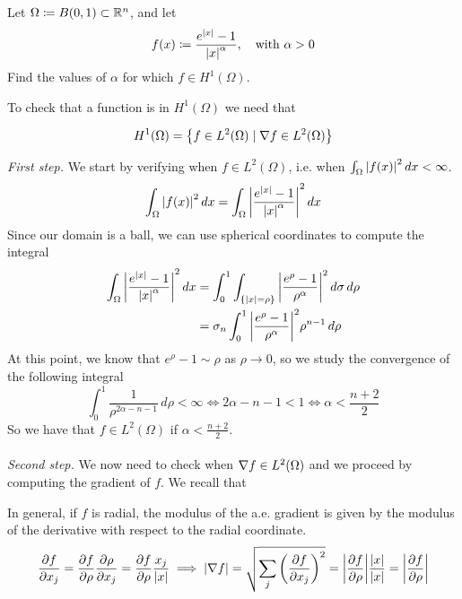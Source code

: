 \newpage
\begin{exercise}
    Let \(\Omega \coloneqq B(0, 1) \subset \mathbb{R}^n\), and let 
    \[
        f(x) \coloneqq \frac{e^{\abs{x}}-1}{\abs{x}^\alpha}, \quad \text{with } \alpha > 0
    \]
    Find the values of \(\alpha\) for which \(f \in H^1(\Omega)\).
\end{exercise}
To check that a function is in \(H^1(\Omega)\) we need that
\begin{remark}
    \[
        H^1(\Omega) = \left\{ f \in L^2(\Omega) \mid \nabla f \in L^2(\Omega) \right\}
    \]  
\end{remark}
\textit{First step.} We start by verifying when \(f \in L^2(\Omega)\), i.e. when \(\int_\Omega \abs{f(x)}^2 \, dx < \infty\).
\[
    \begin{split}
        \int_\Omega \abs{f(x)}^2 \, dx = \int_\Omega \abs{\frac{e^{\abs{x}}-1}{\abs{x}^\alpha}}^2 \, dx
    \end{split}
\]
Since our domain is a ball, we can use spherical coordinates to compute the integral
\begin{align*}
\int_\Omega \abs{\frac{e^{\abs{x}}-1}{\abs{x}^\alpha}}^2 \, dx &= \int_0^1 \int_{\left\{\abs{x} = \rho\right\}} \abs{\frac{e^\rho-1}{\rho^\alpha}}^2 \, d\sigma \, d\rho \\
&= \sigma_n \int_0^1 \abs{\frac{e^\rho-1}{\rho^\alpha}}^2 \rho^{n-1} \, d\rho
\end{align*}
At this point, we know that $e^\rho - 1 \sim \rho$ as $\rho \to 0$, so we study the convergence of the following integral
\begin{equation*}
\int_0^1 \frac{1}{\rho^{2\alpha - n - 1}} \, d\rho < \infty \iff 2 \alpha - n - 1 < 1 \iff \alpha < \frac{n+2}{2}
\end{equation*}
So we have that \(f \in L^2(\Omega)\) if \(\alpha < \frac{n+2}{2}\).\\
\vspace{0.1cm}\\
\textit{Second step.} We now need to check when \(\nabla f \in L^2(\Omega)\) and we proceed by computing the gradient of \(f\).
We recall that 
\begin{remark}
In general, if \(f\) is radial, the modulus of the a.e. gradient is given by the modulus of the derivative with respect to the radial coordinate.
\begin{equation*}
\frac{\partial f}{\partial x_j} = \frac{\partial f}{\partial \rho} \frac{\partial \rho}{\partial x_j} = \frac{\partial f}{\partial \rho} \frac{x_j}{\abs{x}}
\implies \abs{\nabla f} = \sqrt{\sum_j \left(\frac{\partial f}{\partial x_j}\right)^2} = \abs{\frac{\partial f}{\partial \rho}} \frac{\abs{x}}{\abs{x}} = \abs{\frac{\partial f}{\partial \rho}}
\end{equation*}
\end{remark}
